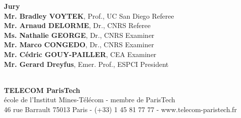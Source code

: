 \documentclass[12pt,a4paper]{book}
\begin{document}
%
%
%
\vfill
%
%
%
\flushleft
\begin{minipage}{.9\textwidth}	%
{\bf Jury}\\
{\bf Mr. Bradley VOYTEK}, {\small Prof., UC San Diego}
	\hfill Referee\\
{\bf Mr. Arnaud DELORME}, {\small Dr., CNRS}
	\hfill Referee\\
{\bf Ms. Nathalie GEORGE}, {\small Dr., CNRS} \hfill Examiner\\
{\bf Mr. Marco CONGEDO}, {\small Dr., CNRS}
	\hfill Examiner\\
{\bf Mr. C\'{e}dric GOUY-PAILLER}, {\small CEA}
	\hfill Examiner\\
{\bf Mr. Gerard Dreyfus}, {\small Emer. Prof., ESPCI}
	\hfill President\\

\end{minipage}\\
%
%
%
\vspace{-.3cm}
%
%
%
{\centering
{\bf TELECOM ParisTech}\\
{\small \'{e}cole de l'Institut Mines-T\'{e}l\'{e}com - membre de ParisTech}\\
{\tiny 46 rue Barrault 75013 Paris - (+33) 1 45 81 77 77 - www.telecom-paristech.fr}}
%
%
%
%
\end{document}
